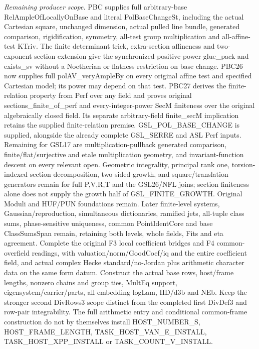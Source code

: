 \documentclass[11pt,a4paper]{article}
\numberwithin{equation}{section}
\theoremstyle{remark}\newtheorem{remark}[theorem]{Remark}
\begin{document}
\emph{Remaining producer scope.} PBC supplies full arbitrary-base RelAmpleOfLocallyOnBase and literal PolBaseChangeSt, including the actual Cartesian square, unchanged dimension, actual pulled line bundle, generated comparison, rigidification, symmetry, all-test group multiplication and all-affine-test KTriv. The finite determinant trick, extra-section affineness and two-exponent section extension give the synchronized positive-power glue\_\allowbreak pack and exists\_\allowbreak sv without a Noetherian or flatness restriction on base change. PBC26 now supplies full polAV\_\allowbreak veryAmpleBy on every original affine test and specified Cartesian model; its power may depend on that test. PBC27 derives the finite-relation property from Perf over any field and proves original sections\_\allowbreak finite\_\allowbreak of\_\allowbreak perf and every-integer-power SecM finiteness over the original algebraically closed field. Its separate arbitrary-field finite\_\allowbreak secM implication retains the supplied finite-relation premise. GSL\_\allowbreak POL\_\allowbreak BASE\_\allowbreak CHANGE is supplied, alongside the already complete GSL\_\allowbreak SERRE and ASL Perf inputs. Remaining for GSL17 are multiplication-pullback generated comparison, finite/flat/surjective and etale multiplication geometry, and invariant-function descent on every relevant open. Geometric integrality, principal rank one, torsion-indexed section decomposition, two-sided growth, and square/translation generators remain for full P,V,R,T and the GSL26/NFL joins; section finiteness alone does not supply the growth half of GSL\_\allowbreak FINITE\_\allowbreak GROWTH. Original Moduli and HUF/PUN foundations remain. Later finite-level systems, Gaussian/reproduction, simultaneous dictionaries, ramified jets, all-tuple class sums, phase-sensitive uniqueness, common PointIdentCore and base ClassSumsSpan remain, retaining both levels, whole fields, Fits and eta agreement. Complete the original F3 local coefficient bridges and F4 common-overfield readings, with valuation/norm/GoodCoef/iq and the entire coefficient field, and actual complex Hecke standard/no-Jordan plus arithmetic character data on the same form datum. Construct the actual base rows, host/frame lengths, nonzero chains and group ties, MultEq support, eigensystem/carrier/parts, all-embedding logLam, HD/d3b and NEb. Keep the stronger second DivRows3 scope distinct from the completed first DivDef3 and row-pair integrability. The full arithmetic entry and conditional common-frame construction do not by themselves install HOST\_\allowbreak NUMBER\_\allowbreak S, HOST\_\allowbreak FRAME\_\allowbreak LENGTH, TASK\_\allowbreak HOST\_\allowbreak VAN\_\allowbreak E\_\allowbreak INSTALL, TASK\_\allowbreak HOST\_\allowbreak XPP\_\allowbreak INSTALL or TASK\_\allowbreak COUNT\_\allowbreak V\_\allowbreak INSTALL.
\end{document}
